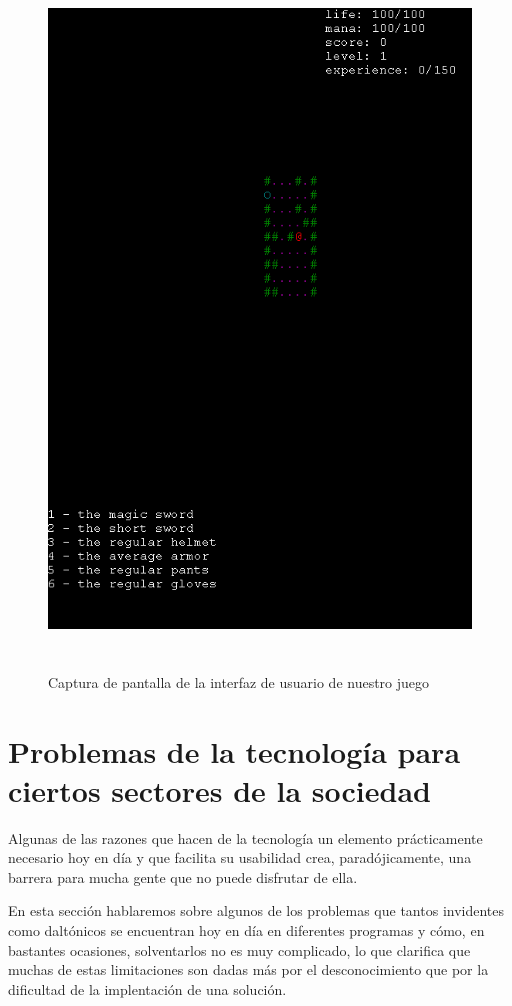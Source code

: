 \begin{figure}[H]
		\includegraphics[width=140mm, height=185mm]{./img/roomsGameGeneral.png}
	\caption{Captura de pantalla de la interfaz de usuario de nuestro juego}
	\label{fig:roomsgamegeneral}
\end{figure}

\section{Problemas de la tecnología para ciertos sectores de la sociedad}

Algunas de las razones que hacen de la tecnología un elemento prácticamente necesario hoy en día y que facilita su usabilidad crea, paradójicamente, una barrera para mucha gente que no puede disfrutar de ella.

En esta sección hablaremos sobre algunos de los problemas que tantos invidentes como daltónicos se encuentran hoy en día en diferentes programas y cómo, en bastantes ocasiones, solventarlos no es muy complicado, lo que clarifica que muchas de estas limitaciones son dadas más por el desconocimiento que por la dificultad de la implentación de una solución.

